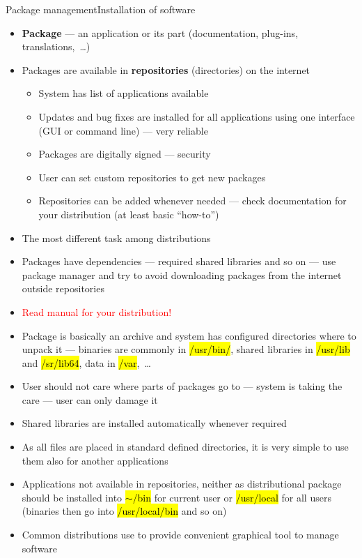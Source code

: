 \documentclass[compress, ucs, xelatex, 11pt, xcolor=svgnames, aspectratio=169,
	hyperref={
		bookmarks=true,
		unicode=true,
		colorlinks=true,
		pdftitle={Linux, command line and MetaCentrum},
		plainpages=false,
		pdfauthor={Vojtech Zeisek},
		pdfsubject={Course about use of Linux command line, writing shell scripts and using MetaCentrum of CESNET},
		pdfcreator={XeLaTeX},
		pdfkeywords={Linux, GNU, BASH, shell, command line, MetaCentrum},
		linkcolor=DarkRed, %
		anchorcolor=DarkBlue, %
		citecolor=Indigo, %
		filecolor=NavyBlue, %
		menucolor=DarkMagenta, %
		urlcolor=DarkBlue, %
		pdftex},
	url={hyphens, lowtilde} %
	]{beamer}
\renewcommand{\texttt}[1]{\hl{\ttfamily #1}}
\renewcommand{\alert}[1]{\textcolor{red}{#1}}
\begin{document}
\begin{frame}[allowframebreaks]{Package management}{Installation of software}
	\begin{itemize}
		\item \textbf{Package} --- an application or its part (documentation, plug-ins, translations,~\ldots)
		\item Packages are available in \textbf{repositories} (directories) on the internet
		\begin{itemize}
			\item System has list of applications available
			\item Updates and bug fixes are installed for all applications using one interface (GUI or command line) --- very reliable
			\item Packages are digitally signed --- security
			\item User can set custom repositories to get new packages
			\item Repositories can be added whenever needed --- check documentation for your distribution (at least basic \enquote{how-to})
		\end{itemize}
		\item The most different task among distributions
		\item Packages have dependencies --- required shared libraries and so on --- use package manager and try to avoid downloading packages from the internet outside repositories
		\item \alert{Read manual for your distribution!}
		\item Package is basically an archive and system has configured directories where to unpack it --- binaries are commonly in \texttt{/usr/bin/}, shared libraries in \texttt{/usr/lib} and \texttt{/sr/lib64}, data in \texttt{/var},~\ldots
		\item User should not care where parts of packages go to --- system is taking the care --- user can only damage it
		\item Shared libraries are installed automatically whenever required
		\item As all files are placed in standard defined directories, it is very simple to use them also for another applications
		\item Applications not available in repositories, neither as distributional package should be installed into \texttt{$\sim$/bin} for current user or \texttt{/usr/local} for all users (binaries then go into \texttt{/usr/local/bin} and so on)
		\item Common distributions use to provide convenient graphical tool to manage software

\end{itemize}
\end{frame}
\end{document}
